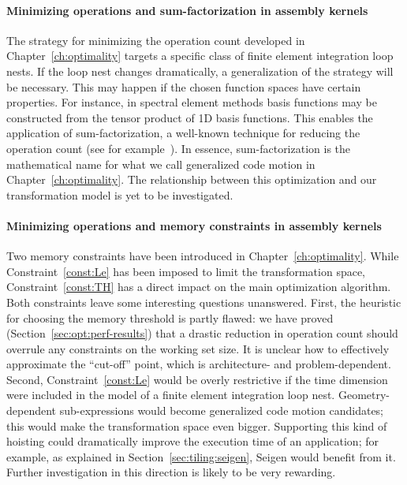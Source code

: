 \paragraph{Minimizing operations and sum-factorization in assembly kernels}
The strategy for minimizing the operation count developed in Chapter~\ref{ch:optimality} targets a specific class of finite element integration loop nests. If the loop nest changes dramatically, a generalization of the strategy will be necessary. This may happen if the chosen function spaces have certain properties. For instance, in spectral element methods basis functions may be constructed from the tensor product of 1D basis functions. This enables the application of sum-factorization, a well-known technique for reducing the operation count (see for example~\cite{spencer}). In essence, sum-factorization is the mathematical name for what we call generalized code motion in Chapter~\ref{ch:optimality}. The relationship between this optimization and our transformation model is yet to be investigated.

\paragraph{Minimizing operations and memory constraints in assembly kernels}
Two memory constraints have been introduced in Chapter~\ref{ch:optimality}. While Constraint~\ref{const:Le} has been imposed to limit the transformation space, Constraint~\ref{const:TH} has a direct impact on the main optimization algorithm. Both constraints leave some interesting questions unanswered. First, the heuristic for choosing the memory threshold is partly flawed: we have proved (Section~\ref{sec:opt:perf-results}) that a drastic reduction in operation count should overrule any constraints on the working set size. It is unclear how to effectively approximate the ``cut-off'' point, which is architecture- and problem-dependent. Second, Constraint~\ref{const:Le} would be overly restrictive if the time dimension were included in the model of a finite element integration loop nest. Geometry-dependent sub-expressions would become generalized code motion candidates; this would make the transformation space even bigger. Supporting this kind of hoisting could dramatically improve the execution time of an application; for example, as explained in Section~\ref{sec:tiling:seigen}, Seigen would benefit from it. Further investigation in this direction is likely to be very rewarding.

